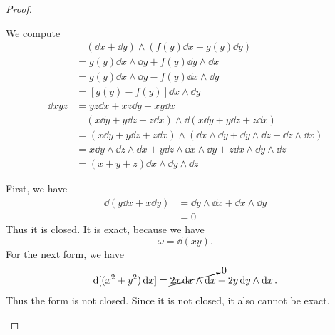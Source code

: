 \begin{proof}
	\begin{parts}
	\item We compute
		\begin{align*}
			&\quad (\dd{x}+\dd{y})\wedge (f(y)\dd{x}+g(y)\dd{y}) \\
			&= g(y)\dd{x}\wedge\dd{y}+f(y)\dd{y}\wedge\dd{x} \\
								      &= g(y)\dd{x}\wedge\dd{y}-f(y)\dd{x}\wedge\dd{y} \\
								      &= [g(y)-f(y)]\dd{x}\wedge\dd{y}\\ 
			\dd{xyz}&= yz\dd{x}+xz\dd{y}+xy\dd{x} \\
				&\quad (x\dd{y}+y\dd{z}+z\dd{x})\wedge \dd{(x\dd{y}+y\dd{z}+z\dd{x})}\\
				&= (x\dd{y}+y\dd{z}+z\dd{x})\wedge (\dd{x}\wedge\dd{y}+\dd{y}\wedge\dd{z}+\dd{z}\wedge\dd{x}) \\
				&= x\dd{y}\wedge\dd{z}\wedge\dd{x}+y\dd{z}\wedge\dd{x}\wedge\dd{y}+z\dd{x}\wedge\dd{y}\wedge\dd{z} \\
				&= (x+y+z)\dd{x}\wedge\dd{y}\wedge\dd{z} 
		\end{align*}
	\item First, we have
		\begin{align*}
			\dd{(y\dd{x}+x\dd{y})} &= \dd{y}\wedge\dd{x}+\dd{x}\wedge\dd{y} \\
			&= 0 
		\end{align*}
		Thus it is closed. It is exact, because we have
		\[
			\omega = \dd{(xy)}
		.\] 
		For the next form, we have
		\[
			\dd{[(x^2+y^2)\dd{x}]} = \cancelto{0}{2x\dd{x}\wedge\dd{x}} + 2y\dd{y}\wedge\dd{x}
		.\] 
		Thus the form is not closed. Since it is not closed, it also cannot be exact.
		

\end{parts}
\end{proof}
